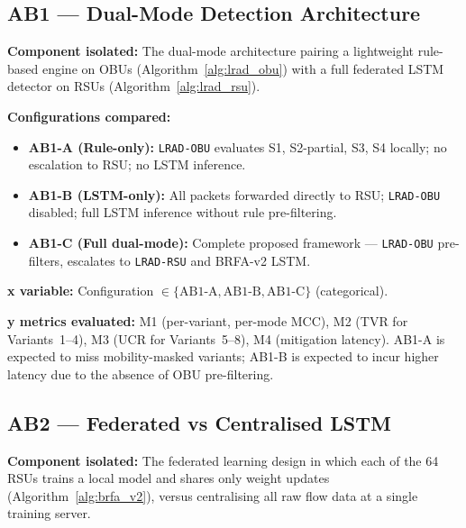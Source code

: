 \documentclass[12pt, a4paper]{report}
\begin{document}
{{%
\subsection{AB1 — Dual-Mode Detection Architecture}
\label{sec:ab1}

\textbf{Component isolated:}
The dual-mode architecture pairing a lightweight rule-based
engine on \ac{OBU}s (Algorithm~\ref{alg:lrad_obu}) with a
full federated \ac{LSTM} detector on \ac{RSU}s
(Algorithm~\ref{alg:lrad_rsu}).

\textbf{Configurations compared:}
\begin{itemize}
    \item \textbf{AB1-A (Rule-only):} \texttt{LRAD-OBU}
    evaluates S1, S2-partial, S3, S4 locally; no escalation
    to RSU; no \ac{LSTM} inference.
    \item \textbf{AB1-B (LSTM-only):} All packets forwarded
    directly to RSU; \texttt{LRAD-OBU} disabled; full
    \ac{LSTM} inference without rule pre-filtering.
    \item \textbf{AB1-C (Full dual-mode):} Complete proposed
    framework — \texttt{LRAD-OBU} pre-filters, escalates to
    \texttt{LRAD-RSU} and BRFA-v2 \ac{LSTM}.
\end{itemize}

\textbf{x variable:} Configuration
$\in \{\text{AB1-A}, \text{AB1-B}, \text{AB1-C}\}$ (categorical).

\textbf{y metrics evaluated:} M1 (per-variant, per-mode MCC),
M2 (TVR for Variants~1--4), M3 (UCR for Variants~5--8),
M4 (mitigation latency). AB1-A is expected to miss
mobility-masked variants; AB1-B is expected to incur higher
latency due to the absence of OBU pre-filtering.


\subsection{AB2 — Federated vs Centralised LSTM}
\label{sec:ab2}

\textbf{Component isolated:}
The federated learning design in which each of the 64
\ac{RSU}s trains a local model and shares only weight
updates (Algorithm~\ref{alg:brfa_v2}), versus centralising
all raw flow data at a single training server.

}}
\end{document}
